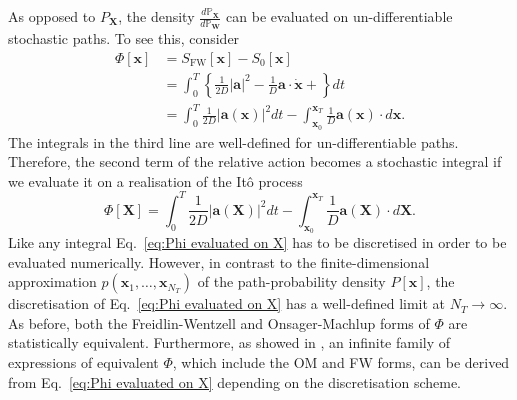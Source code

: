 As opposed to $P_\mathbf{X}$, the density $\frac{d \mathbb{P}_\mathbf{X}}{d \mathbb{P}_\mathbf{W}}$ can be evaluated on un-differentiable stochastic paths. To see this, consider
\begin{equation}
\begin{aligned}
\Phi[\mathbf{x}] & = S_\text{FW}[\mathbf{x}] - S_0[\mathbf{x}] \\
& = \int_0^T \left\{ \frac{1}{2D} |\mathbf{a}|^2 - \frac{1}{D} \mathbf{a} \cdot \dot{\mathbf{x}} +  \right\} dt \\
& = \int_0^T  \frac{1}{2D} |\mathbf{a}(\mathbf{x})|^2 dt - \int_{\mathbf{x}_0}^{\mathbf{x}_T} \frac{1}{D} \mathbf{a}(\mathbf{x}) \cdot d \mathbf{x}.
\end{aligned}
\end{equation}
The integrals in the third line are well-defined for un-differentiable paths. Therefore, the second term of the relative action becomes a stochastic integral if we evaluate it on a realisation of the It\^{o} process
\begin{equation} \label{eq:Phi evaluated on X}
\Phi[\mathbf{X}] = \int_0^T  \frac{1}{2D} |\mathbf{a}(\mathbf{X})|^2 dt - \int_{\mathbf{x}_0}^{\mathbf{x}_T} \frac{1}{D} \mathbf{a}(\mathbf{X}) \cdot d \mathbf{X}.
\end{equation}
Like any integral Eq.~\ref{eq:Phi evaluated on X} has to be discretised in order to be evaluated numerically. However, in contrast to the finite-dimensional approximation $p(\mathbf{x}_1, \dots, \mathbf{x}_{N_T})$ of the path-probability density $P[\mathbf{x}]$, the discretisation of Eq.~\ref{eq:Phi evaluated on X} has a well-defined limit at $N_T \to \infty$. As before, both the Freidlin-Wentzell and Onsager-Machlup forms of $\Phi$ are statistically equivalent. Furthermore, as showed in \citep{gladrowExperimentalMeasurementRelative2021}, an infinite family of expressions of equivalent $\Phi$, which include the OM and FW forms, can be derived from Eq.~\ref{eq:Phi evaluated on X} depending on the discretisation scheme.

